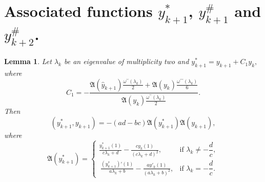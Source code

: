 \documentclass[pdflatex,sn-mathphys-num]{sn-jnl}%
\theoremstyle{thmstyleone}%
\theoremstyle{thmstyletwo}%
\theoremstyle{thmstylethree}%
\newtheorem{lem}[thm]{Lemma}
\theoremstyle{definition}
\theoremstyle{remark}
\numberwithin{equation}{section}
\begin{document}
\section{Associated functions $y_{k+1}^*$, $y_{k+1}^\#$ and $y_{k+2}^\#$.} 
\begin{lem}
Let $\lambda_k$ be an eigenvalue of multiplicity two and
\(
y_{k+1}^* = y_{k+1} + C_1 y_k,
\)
where
\begin{equation}
    C_1=-\frac{\mathfrak{A}(\hat{y}_{k+1})\frac{\omega^{\prime\prime}(\lambda_k)}{2}+\mathfrak{A}(y_k)\frac{\omega^{\prime\prime\prime}(\lambda_k)}{6}}{\mathfrak{A}(y_k)\frac{\omega^{\prime\prime}(\lambda_k)}{2}}. \label{(5.1)}
\end{equation}
Then 
\begin{equation}
(y_{k+1}^*, y_{k+1}) =-(ad-bc)\mathfrak{A}(y_{k+1}^*)\mathfrak{A}(y_{k+1}), \label{(5.2)}
\end{equation}
where 
\begin{equation}
 \mathfrak{A}(y^{*}_{k+1}) =
\begin{cases}
\displaystyle  
\frac{y^{*}_{k + 1}(1)}{c\lambda_{k}+d} - \frac{cy_{k}(1)}{{(c\lambda_{k}+d)}^{2}}, 
& \text{if } \lambda_k \neq -\dfrac{d}{c}, \\[10pt]
\displaystyle \ 
\frac{(y^{*}_{k + 1})'(1)}{a\lambda_{k}+b} - \frac{ay'_{k}(1)}{{(a\lambda_{k}+b)}^{2}}, 
&  \text{if } \lambda_k = -\dfrac{d}{c}.
\end{cases} \label{(5.2.1)}
\end{equation}
\end{lem}
\end{document}
